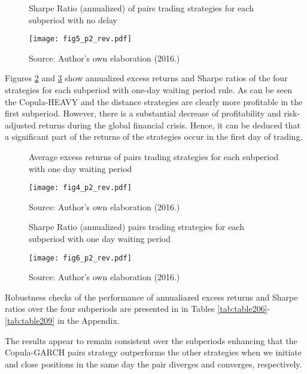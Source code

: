 \documentclass[a4paper,12pt]{report}
\begin{document}
\begin{refsection}
\begin{figure}[H]
	\centering
	\caption{Sharpe Ratio (annualized) of pairs trading strategies for each subperiod with no delay}
	\texttt{[image: fig5\_p2\_rev.pdf]}
	\captionsetup{justification=raggedright,
		singlelinecheck=false
	}
	\caption*{Source: Author's own elaboration (2016.)}
	\label{fig:fig207}
\end{figure}


Figures \ref{fig:fig206} and \ref{fig:fig208} show annualized excess returns and Sharpe ratios of the four strategies for each subperiod with one-day waiting period rule. As can be seen the Copula-HEAVY and the distance strategies are clearly more profitable in the first subperiod. However, there is a substantial decrease of profitability and risk-adjusted returns during the global financial crisis. Hence, it can be deduced that a significant part of the returns of the strategies occur in the first day of trading.

\begin{figure}[H]
	\centering
	\caption{Average excess returns of pairs trading strategies for each subperiod with one day waiting period}
	\texttt{[image: fig4\_p2\_rev.pdf]}
	\captionsetup{justification=raggedright,
		singlelinecheck=false
	}
	\caption*{Source: Author's own elaboration (2016.)}
	\label{fig:fig206}
\end{figure}

\begin{figure}[H]
	\centering
	\caption{Sharpe Ratio (annualized) pairs trading strategies for each subperiod with one day waiting period}
	\texttt{[image: fig6\_p2\_rev.pdf]}
	\captionsetup{justification=raggedright,
		singlelinecheck=false
	}
	\caption*{Source: Author's own elaboration (2016.)}
	\label{fig:fig208}
\end{figure}

\vspace{0.3cm}

Robustness checks of the performance of annualiazed excess returns and Sharpe ratios over the four subperiods are presented in in Tables \ref{tab:table206}-\ref{tab:table209} in the Appendix.

The results appear to remain consistent over the subperiods enhancing that the Copula-GARCH pairs strategy outperforms the other strategies when we initiate and close positions in the same day the pair diverges and converges, respectively.


\end{refsection}
\end{document}
